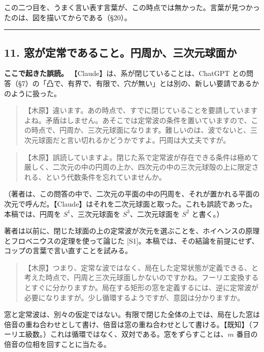 \documentclass[
  a4paper,
]{ltjsarticle}
\begin{document}
この二つ目を、うまく言い表す言葉が、この時点では無かった。言葉が見つかったのは、図を描いてからである（§20）。

\begin{center}\rule{0.5\linewidth}{0.5pt}\end{center}

\subsection{11.
窓が定常であること。円周か、三次元球面か}\label{ux7a93ux304cux5b9aux5e38ux3067ux3042ux308bux3053ux3068ux5186ux5468ux304bux4e09ux6b21ux5143ux7403ux9762ux304b}

\textbf{ここで起きた誤読。} 【Claude】は、系が閉じていることは、ChatGPT
との問答（§7）の「凸で、有界で、有限で、穴が無い」とは別の、新しい要請であるかのように扱った。

\begin{quote}
【木原】違います。あの時点で、すでに閉じていることを要請していますよね。矛盾はしません。あそこでは定常波の条件を置いていますので、この時点で、円周か、三次元球面になります。難しいのは、波でないと、三次元球面だと言い切れるかどうかですよ。円周は大丈夫ですが。
\end{quote}

\begin{quote}
【木原】誤読していますよ。閉じた系で定常波が存在できる条件は極めて厳しく、二次元の中の円周の上か、四次元の中の三次元球殻の上に限定される、という代数条件を忘れていませんか。
\end{quote}

（著者は、この問答の中で、二次元の平面の中の円周を、それが置かれる平面の次元で呼んだ。【Claude】はそれを二次元球面と取った。これも誤読であった。本稿では、円周を
\(S^1\)、三次元球面を \(S^3\)、二次元球面を \(S^2\) と書く。）

著者は以前に、閉じた球面の上の定常波が次元を選ぶことを、ホイヘンスの原理とフロベニウスの定理を使って論じた
{[}S1{]}。本稿では、その結論を前提にせず、コップの言葉で言い直すことを試みる。

\begin{quote}
【木原】つまり、定常な波ではなく、局在した定常状態が定義できる、と考えた時点で、円周と三次元球面しかないのですかね。フーリエ変換するとすぐに分かりますか。局在する矩形の窓を定義するには、逆に定常波が必要になりますが。少し循環するようですが、意図は分かりますか。
\end{quote}

窓と定常波は、別々の仮定ではない。有限で閉じた全体の上では、局在した窓は倍音の重ね合わせとして書け、倍音は窓の重ね合わせとして書ける。【既知】（フーリエ級数。）これは循環ではなく、双対である。窓をずらすことは、\(m\)
番目の倍音の位相を回すことに当たる。
\end{document}
